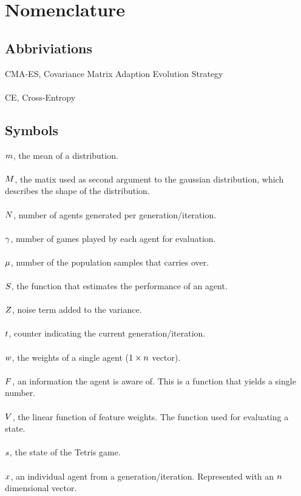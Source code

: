 \section{Nomenclature}

\subsection{Abbriviations}
CMA-ES, Covariance Matrix Adaption Evolution Strategy\\
\\
CE, Cross-Entropy

\subsection{Symbols}

$m$, the mean of a distribution.\\
\\
$M$, the matix used as second argument to the gaussian distribution, which describes the shape of the distribution.\\
\\
$N$, number of agents generated per generation/iteration.\\
\\
$\gamma$, number of games played by each agent for evaluation.\\
\\
$\mu$, number of the population samples that carries over.\\
\\
$S$, the function that estimates the performance of an agent.\\
\\
$Z$, noise term added to the variance.\\
\\
$t$, counter indicating the current generation/iteration.\\
\\
$w$, the weights of a single agent ($1 \times n$ vector).\\
\\
$F$, an information the agent is aware of. This is a function that yields a single number.\\
\\
$V$, the linear function of feature weights. The function used for evaluating a state.\\
\\
$s$, the state of the Tetris game.\\
\\
$x$, an individual agent from a generation/iteration. Represented with an $n$ dimensional vector.